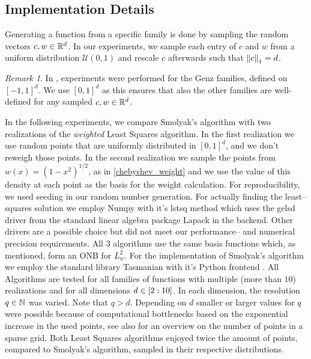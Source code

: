\documentclass[12pt, oneside]{amsart}
\theoremstyle{definition}
\theoremstyle{remark}
\newtheorem{remark}[thm]{Remark}
\numberwithin{equation}{section}
\begin{document}
\subsection{Implementation Details}

Generating a function from a specific family is done 
by sampling the random vectors $c, w \in\R^d$. In our experiments, we sample 
each entry of $c$ and $w$ from a uniform distribution $\mathcal{U}(0,1)$ and 
rescale $c$ afterwards such that $\norm[1]{c}=d$.

\begin{remark}
	In \cite{BarthelmannHighDim_2000}, experiments were performed for the Genz 
	families, defined on $[-1,1]^d$. We use $[0,1]^d$ as this ensures that also 
	the other families are well-defined for any sampled $c,w\in\R^d$.
\end{remark}

In the following experiments, we compare Smolyak's algorithm with two 
realizations of the \emph{weighted} Least Squares algorithm. In the first 
realization we use random points that are uniformly distributed in $[0,1]^d$, 
and we don't reweigh those points. In the second realization we sample the 
points from $w(x) = (1-x^2)^{1/2}$, as in \ref{chebyshev_weight} and we use the value of 
this density at each point as the basis for the weight calculation.
For reproducibility, we used seeding in our random number generation.
For actually finding the least--squares solution we employ Numpy \cite{HarrisNumpy_2020} with it's \textrm{lstsq} method which uses the \textrm{gelsd} driver from the standard linear algebra package Lapack \cite{lapack99} in the backend.
Other drivers are a possible choice but did not meet our performance-- and numerical precision requirements.
All 3 algorithms use the same basis functions  
which, as mentioned, form an ONB for \(L^2_w\). For the implementation of 
Smolyak's algorithm we employ the standard library Tasmanian  with it's Python frontend 
\cite{stoyanov2015tasmanian,stoyanov2016dynamically,stoyanov2018adaptive,morrow2019method,doecode_6305}.
All Algorithms are tested for all families of functions with multiple (more than \(10\)) 
realizations and for all dimensions $d\in \indexset[2]{10}$. In each dimension, 
the resolution $q\in\N$ was varied. Note that $q>d$. Depending on $d$ 
smaller or larger values for $q$ were possible because of computational 
bottlenecks based on the exponential increase in the used points, see also 
\cite{BurkardtCounting_2014} for an overview on the number of points in a sparse 
grid. Both Least Squares algorithms enjoyed twice the amount of points, 
compared to Smolyak's algorithm, sampled in their respective distributions.
\end{document}
